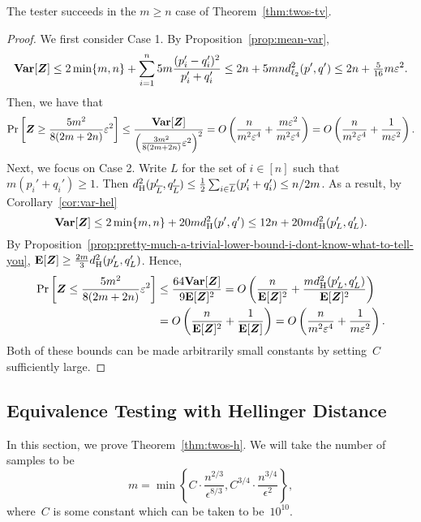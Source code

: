 \begin{lemma}
The tester succeeds in the $m \geq n$ case of Theorem~\ref{thm:twos-tv}.
\end{lemma}
\begin{proof}
We first consider Case 1.
By Proposition~\ref{prop:mean-var},
\begin{equation*}
\mbox{\bf Var}[\boldsymbol{Z}]
\leq 2 \min\{m, n\} + \sum_{i=1}^n 5m \frac{(p_i' - q_i')^2}{p_i' + q_i'}
\leq 2 n + 5 m n d_{\ell_2}^2(p',q')
\leq 2 n + \tfrac{5}{16} m \varepsilon^2.
\end{equation*}
Then, we have that
\begin{equation*}
\Pr\left[\boldsymbol{Z} \geq \frac{5 m^2}{8(2m +2n)} \varepsilon^2\right]
\leq \frac{\mbox{\bf Var}[\boldsymbol{Z}]}{\left(\frac{3m^2}{8(2m +2n)} \varepsilon^2\right)^2}
= O\left(\frac{n}{m^2 \varepsilon^4} + \frac{m\varepsilon^2}{m^2 \varepsilon^4}\right)
= O\left(\frac{n}{m^2 \varepsilon^4} + \frac{1}{m \varepsilon^2}\right).
\end{equation*}
Next, we focus on Case 2.
Write $L$ for the set of $i \in [n]$ such that $m(p_i' + q_i') \geq 1$.
Then $d_{\mathrm {H}}^2(p_{\overline{L}}',q_{\overline{L}}') \leq \frac12 \sum_{i \in \overline{L}} (p_i' + q_i') \leq n/2m$.
As a result, 
by Corollary~\ref{cor:var-hel}
\begin{equation*}
\mbox{\bf Var}[\boldsymbol{Z}] \leq 2 \min\{m, n\} +  20m d_{\mathrm {H}}^2(p',q')
\leq 12 n + 20m d_{\mathrm {H}}^2(p_L',q_L'). 
\end{equation*}
By Proposition~\ref{prop:pretty-much-a-trivial-lower-bound-i-dont-know-what-to-tell-you},
$\mbox{\bf E}[\boldsymbol{Z}] \geq \frac{2m}{3} d_{\mathrm {H}}^2(p_L',q_L')$.
Hence, 
\begin{align*}
\Pr\left[\boldsymbol{Z} \leq \frac{5 m^2}{8(2m +2n)} \varepsilon^2\right]
&\leq \frac{64 \mbox{\bf Var}[\boldsymbol{Z}]}{9\mbox{\bf E}[\boldsymbol{Z}]^2}
= O\left(\frac{n}{\mbox{\bf E}[\boldsymbol{Z}]^2} + \frac{m d_{\mathrm {H}}^2(p_L',q_L')}{\mbox{\bf E}[\boldsymbol{Z}]^2}\right)\\
&= O\left(\frac{n}{\mbox{\bf E}[\boldsymbol{Z}]^2} + \frac{1}{\mbox{\bf E}[\boldsymbol{Z}]}\right)
= O\left(\frac{n}{m^2 \varepsilon^4} + \frac{1}{m \varepsilon^2}\right).
\end{align*}
Both of these bounds can be made arbitrarily small constants by setting~$C$ sufficiently large.
\end{proof}



\subsection{Equivalence Testing with Hellinger Distance}
\label{sec:eq-h}

In this section, we prove Theorem~\ref{thm:twos-h}. 
We will take the number of samples to be 
\begin{equation*}
m = \min\left\{C\cdot \frac{n^{2/3}}{\epsilon^{8/3}}, C^{3/4}\cdot \frac{n^{3/4}}{\epsilon^2}\right\},
\end{equation*}
where~$C$ is some constant which can be taken to be~$10^{10}$.

